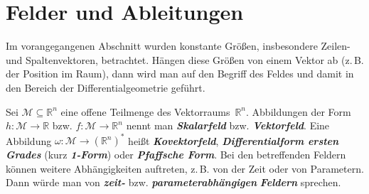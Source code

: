 \section{Felder und Ableitungen\label{sec:Felder-und-Ableitungen}}

Im vorangegangenen Abschnitt wurden konstante Größen, insbesondere
Zeilen- und Spaltenvektoren, betrachtet. Hängen diese Größen von einem
Vektor ab (z.\,B. der Position im Raum), dann wird man auf den Begriff
des Feldes und damit in den Bereich der Differentialgeometrie geführt.

Sei $\mathcal{M}\subseteq{\mathbb{R}}^{n}$ eine offene Teilmenge des Vektorraums~${\mathbb{R}}^{n}$.
Abbildungen der Form $h:\mathcal{M}\to{\mathbb{R}}$ bzw. $f:\mathcal{M}\to{\mathbb{R}}^{n}$
nennt man \textbf{\em Skalarfeld} bzw. \textbf{\em Vektorfeld}.
Eine Abbildung $\omega:\mathcal{M}\to({\mathbb{R}}^{n})^{*}$ heißt \textbf{\em Kovektorfeld},
\textbf{\em Differentialform ersten Grades}
(kurz \textbf{\em 1-Form}) oder \textbf{\em Pfaffsche Form}. Bei den betreffenden
Feldern können weitere Abhängigkeiten auftreten, z.\,B. von der Zeit
oder von Parametern. Dann würde man von \textbf{\em zeit-} bzw. \textbf{\em parameterabhängigen}
\textbf{\em Feldern} sprechen.

